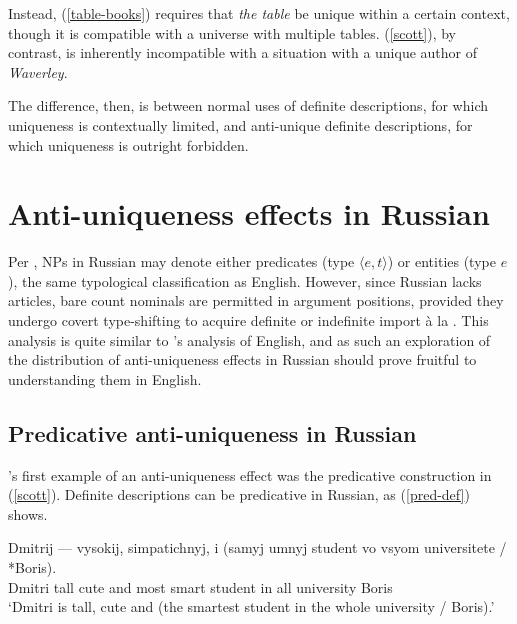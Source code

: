 \documentclass{article}
\begin{document}
Instead, (\ref{table-books}) requires that \textit{the table} be unique within a certain context, though it is compatible with a universe with multiple tables. (\ref{scott}), by contrast, is inherently incompatible with a situation with a unique author of \textit{Waverley}.

The difference, then, is between normal uses of definite descriptions, for which uniqueness is contextually limited, and anti-unique definite descriptions, for which uniqueness is outright forbidden.




\section{Anti-uniqueness effects in Russian \label{sec:anti-uniqueness-ru}}
Per \citet{chierchia98}, NPs in Russian may denote either predicates (type $\langle e, t \rangle$) or entities (type $e$), the same typological classification as English. However, since Russian lacks articles, bare count nominals are permitted in argument positions, provided they undergo covert type-shifting to acquire definite or indefinite import \`{a} la \citet{partee86}. This analysis is quite similar to \citeauthor{cb2015}'s analysis of English, and as such an exploration of the distribution of anti-uniqueness effects in Russian should prove fruitful to understanding them in English.

\subsection{Predicative anti-uniqueness in Russian}
\citeauthor{cb2015}'s first example of an anti-uniqueness effect was the predicative construction in (\ref{scott}). Definite descriptions can be predicative in Russian, as (\ref{pred-def}) shows.

\begin{exe}
	\ex \label{pred-def} \gll Dmitrij --- vysokij, simpatichnyj, i (samyj umnyj student vo vsyom universitete / *Boris).\\
	Dmitri {} tall cute and most smart student in all university {} Boris\\
	\glt `Dmitri is tall, cute and (the smartest student in the whole university / Boris).'
\end{exe}
\end{document}
